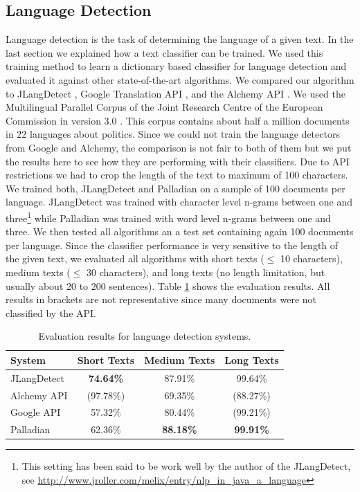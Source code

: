 \documentclass[a4paper,twoside]{book}      %
\begin{document}
\subsection{Language Detection}
Language detection is the task of determining the language of a given text. In the last section we explained how a text classifier can be trained. We used this training method to learn a dictionary based classifier for language detection and evaluated it against other state-of-the-art algorithms.
We compared our algorithm to JLangDetect \cite{jlangdetect}, Google Translation API \cite{googleTranslationAPI}, and the Alchemy API \cite{alchemyLanguageAPI}. We used the Multilingual Parallel Corpus of the Joint Research Centre of the European Commission in version 3.0 \cite{jrcCorpus}. This corpus contains about half a million documents in 22 languages about politics. Since we could not train the language detectors from Google and Alchemy, the comparison is not fair to both of them but we put the results here to see how they are performing with their classifiers. Due to API restrictions we had to crop the length of the text to maximum of 100 characters.
We trained both, JLangDetect and Palladian on a sample of 100 documents per language. JLangDetect was trained with character level n-grams between one and three\footnote{This setting has been said to be work well by the author of the JLangDetect, see \url{http://www.jroller.com/melix/entry/nlp_in_java_a_language}} while Palladian was trained with word level n-grams between one and three. We then tested all algorithms an a test set containing again 100 documents per language. Since the classifier performance is very sensitive to the length of the given text, we evaluated all algorithms with short texts ($\leq$ 10 characters), medium texts ($\leq$ 30 characters), and long texts (no length limitation, but usually about 20 to 200 sentences).
Table \ref{tab:languageDetectionEvaluation} shows the evaluation results. All results in brackets are not representative since many documents were not classified by the API.

\begin{table}[ht]
\centering
\begin{tabular}{|l|c|c|c|}
	\hline
	System & Short Texts & Medium Texts & Long Texts \\ 
	\hline
	JLangDetect & \textbf{74.64\%} & 87.91\% & 99.64\% \\ 
	\hline
	Alchemy API & (97.78\%) & 69.35\% & (88.27\%) \\ 
	\hline
	Google API & 57.32\% & 80.44\% & (99.21\%) \\ 
	\hline
	Palladian & 62.36\% & \textbf{88.18\%} & \textbf{99.91\%}  \\ 
	\hline
\end{tabular}
\caption{Evaluation results for language detection systems.}
\label{tab:languageDetectionEvaluation}
\end{table}
\end{document}
